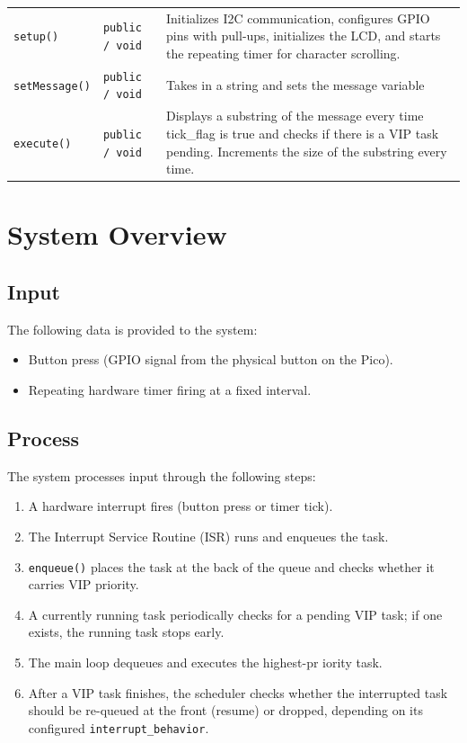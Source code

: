 \documentclass[12pt]{article}
\begin{document}
\begin{longtable}{P{3.5cm} P{3.8cm} P{6.7cm}}
\texttt{setup()}         & \texttt{public / void}               & Initializes I2C communication, configures GPIO pins with pull-ups, initializes the LCD, and starts the repeating timer for character scrolling. \\
\texttt{setMessage()}         & \texttt{public / void}               & Takes in a string and sets the message variable \\
\texttt{execute()} & \texttt{public / void}        & Displays a substring of the message every time tick\_flag is true and checks if there is a VIP task pending. Increments the size of the substring every time. \\
\bottomrule
\end{longtable}

\newpage

\section*{System Overview}

\subsection*{Input}
The following data is provided to the system:
\begin{itemize}[leftmargin=1.5em]
    \item Button press (GPIO signal from the physical button on the Pico).
    \item Repeating hardware timer firing at a fixed interval.
\end{itemize}

\subsection*{Process}
The system processes input through the following steps:
\begin{enumerate}[leftmargin=1.5em]
    \item A hardware interrupt fires (button press or timer tick).
    \item The Interrupt Service Routine (ISR) runs and enqueues the task.
    \item \texttt{enqueue()} places the task at the back of the queue and checks whether it carries VIP priority.
    \item A currently running task periodically checks for a pending VIP task; if one exists, the running task stops early.
    \item The main loop dequeues and executes the highest-pr iority task.
    \item After a VIP task finishes, the scheduler checks whether the interrupted task should be re-queued at the front (resume) or dropped, depending on its configured \texttt{interrupt\_behavior}.
\end{enumerate}
\end{document}

